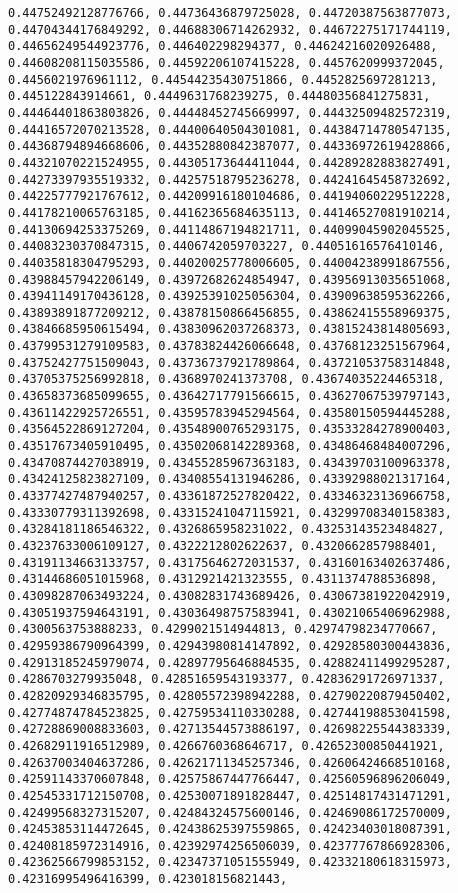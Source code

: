 \documentclass[11pt]{article}
\begin{document}
\begin{Verbatim}[commandchars=\\\{\}]
0.44752492128776766, 0.44736436879725028, 0.44720387563877073, 0.44704344176849292, 0.44688306714262932, 0.44672275171744119, 0.44656249544923776, 0.446402298294377, 0.44624216020926488, 0.44608208115035586, 0.44592206107415228, 0.4457620999372045, 0.4456021976961112, 0.44544235430751866, 0.4452825697281213, 0.445122843914661, 0.4449631768239275, 0.44480356841275831, 0.44464401863803826, 0.44448452745669997, 0.44432509482572319, 0.44416572070213528, 0.44400640504301081, 0.44384714780547135, 0.44368794894668606, 0.44352880842387077, 0.44336972619428866, 0.44321070221524955, 0.44305173644411044, 0.44289282883827491, 0.44273397935519332, 0.44257518795236278, 0.44241645458732692, 0.44225777921767612, 0.44209916180104686, 0.44194060229512228, 0.44178210065763185, 0.44162365684635113, 0.44146527081910214, 0.44130694253375269, 0.44114867194821711, 0.44099045902045525, 0.44083230370847315, 0.4406742059703227, 0.44051616576410146, 0.44035818304795293, 0.44020025778006605, 0.44004238991867556, 0.43988457942206149, 0.43972682624854947, 0.43956913035651068, 0.43941149170436128, 0.43925391025056304, 0.43909638595362266, 0.43893891877209212, 0.43878150866456855, 0.43862415558969375, 0.43846685950615494, 0.43830962037268373, 0.43815243814805693, 0.43799531279109583, 0.43783824426066648, 0.43768123251567964, 0.43752427751509043, 0.43736737921789864, 0.43721053758314848, 0.43705375256992818, 0.4368970241373708, 0.43674035224465318, 0.43658373685099655, 0.43642717791566615, 0.43627067539797143, 0.43611422925726551, 0.43595783945294564, 0.43580150594445288, 0.43564522869127204, 0.43548900765293175, 0.43533284278900403, 0.43517673405910495, 0.43502068142289368, 0.43486468484007296, 0.43470874427038919, 0.43455285967363183, 0.43439703100963378, 0.43424125823827109, 0.43408554131946286, 0.43392988021317164, 0.43377427487940257, 0.43361872527820422, 0.43346323136966758, 0.43330779311392698, 0.43315241047115921, 0.43299708340158383, 0.43284181186546322, 0.4326865958231022, 0.43253143523484827, 0.43237633006109127, 0.4322212802622637, 0.4320662857988401, 0.43191134663133757, 0.43175646272031537, 0.43160163402637486, 0.43144686051015968, 0.4312921421323555, 0.4311374788536898, 0.43098287063493224, 0.43082831743689426, 0.43067381922042919, 0.43051937594643191, 0.43036498757583941, 0.43021065406962988, 0.4300563753888233, 0.4299021514944813, 0.42974798234770667, 0.42959386790964399, 0.42943980814147892, 0.42928580300443836, 0.42913185245979074, 0.42897795646884535, 0.42882411499295287, 0.4286703279935048, 0.42851659543193377, 0.42836291726971337, 0.42820929346835795, 0.42805572398942288, 0.42790220879450402, 0.42774874784523825, 0.42759534110330288, 0.42744198853041598, 0.42728869008833603, 0.42713544573886197, 0.42698225544383339, 0.42682911916512989, 0.4266760368646717, 0.42652300850441921, 0.42637003404637286, 0.42621711345257346, 0.42606424668510168, 0.42591143370607848, 0.42575867447766447, 0.42560596896206049, 0.42545331712150708, 0.42530071891828447, 0.42514817431471291, 0.42499568327315207, 0.42484324575600146, 0.42469086172570009, 0.42453853114472645, 0.42438625397559865, 0.42423403018087391, 0.42408185972314916, 0.42392974256506039, 0.42377767866928306, 0.42362566799853152, 0.42347371051555949, 0.42332180618315973, 0.42316995496416399, 0.423018156821443, 
\end{Verbatim}
\end{document}

